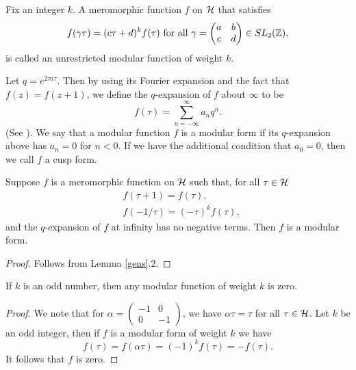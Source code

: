 \begin{definition}
Fix an integer $k$. A meromorphic function $f$ on $\mathcal{H}$ that satisfies
$$f(\gamma\tau) = (c\tau+d)^{k}f(\tau) \text{ for all } \gamma = \begin{pmatrix} a & b \\  c & d \end{pmatrix} \in SL_2(\mathbb{Z}),$$
is called an unrestricted modular function of weight $k$.
\end{definition}
Let $q = e^{2\pi i\tau}$. Then by using its Fourier expansion and the fact that $f(z) = f(z + 1)$, we define the $q$-expansion of $f$ about $\infty$ to be
$$f(\tau) = \sum_{n=-\infty}^{\infty}a_nq^n.$$
(See \cite[Page 224]{Knapp}). We say that a modular function $f$ is a modular form if its $q$-expansion above has $a_n = 0$ for $n<0$. If we have the additional condition that $a_0 = 0$, then we call $f$ a cusp form.
\begin{cor} Suppose $f$ is a meromorphic function on $\mathcal{H}$ such that, for all $\tau \in \mathcal{H}$
\begin{align*}
&f(\tau + 1) = f(\tau), \\
&f(-1/\tau) = (-\tau)^kf(\tau),
\end{align*}
and the $q$-expansion of $f$ at infinity has no negative terms. Then $f$ is a modular form.
\end{cor}
\begin{proof}
Follows from Lemma \ref{gens}.2.
\end{proof}
\begin{prop}
If $k$ is an odd number, then any modular function of weight $k$ is zero.
\end{prop}
\begin{proof}
We note that for $\alpha = \left(\begin{smallmatrix} -1 & 0 \\  0 & -1 \end{smallmatrix}\right)$, we have $\alpha\tau = \tau$ for all $\tau \in \mathcal{H}$. Let $k$ be an odd integer, then if $f$ is a modular form of weight $k$ we have
$$f(\tau) = f(\alpha\tau) = (-1)^k f(\tau) = -f(\tau).$$
It follows that $f$ is zero.
\end{proof}


